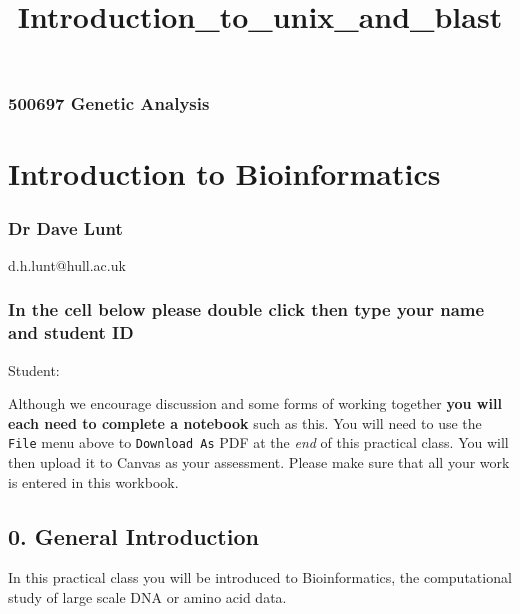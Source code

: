 \documentclass[11pt]{article}
\title{Introduction\_to\_unix\_and\_blast}
\begin{document}
    
    
    \maketitle
    
    

    
    \hypertarget{genetic-analysis}{%
\subsubsection{500697 Genetic Analysis}\label{genetic-analysis}}

\hypertarget{introduction-to-bioinformatics}{%
\section{Introduction to
Bioinformatics}\label{introduction-to-bioinformatics}}

\hypertarget{dr-dave-lunt}{%
\subsubsection{Dr Dave Lunt}\label{dr-dave-lunt}}

d.h.lunt@hull.ac.uk

    \hypertarget{in-the-cell-below-please-double-click-then-type-your-name-and-student-id}{%
\subsubsection{In the cell below please double click then type your name
and student
ID}\label{in-the-cell-below-please-double-click-then-type-your-name-and-student-id}}

    Student:

    Although we encourage discussion and some forms of working together
\textbf{you will each need to complete a notebook} such as this. You
will need to use the \texttt{File} menu above to \texttt{Download\ As}
PDF at the \emph{end} of this practical class. You will then upload it
to Canvas as your assessment. Please make sure that all your work is
entered in this workbook.

    \hypertarget{general-introduction}{%
\subsection{0. General Introduction}\label{general-introduction}}

In this practical class you will be introduced to Bioinformatics, the
computational study of large scale DNA or amino acid data.
\end{document}
